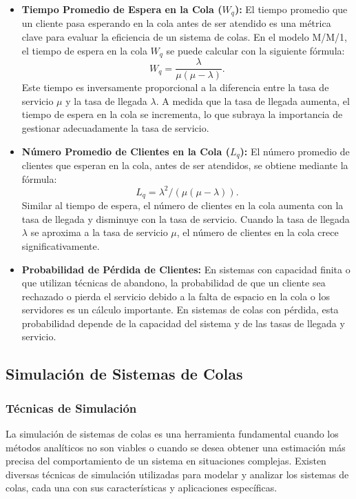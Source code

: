 \documentclass{article}
\begin{document}
\begin{itemize}
    \item \textbf{Tiempo Promedio de Espera en la Cola (\(W_q\)):}  
    El tiempo promedio que un cliente pasa esperando en la cola antes de ser atendido es una métrica clave para evaluar la eficiencia de un sistema de colas. En el modelo M/M/1, el tiempo de espera en la cola \(W_q\) se puede calcular con la siguiente fórmula:
    \[
      W_q = \frac{\lambda}{\mu(\mu - \lambda)}.
    \]
    Este tiempo es inversamente proporcional a la diferencia entre la tasa de servicio \( \mu \) y la tasa de llegada \( \lambda \). A medida que la tasa de llegada aumenta, el tiempo de espera en la cola se incrementa, lo que subraya la importancia de gestionar adecuadamente la tasa de servicio.

    \item \textbf{Número Promedio de Clientes en la Cola (\(L_q\)):}  
    El número promedio de clientes que esperan en la cola, antes de ser atendidos, se obtiene mediante la fórmula:
    \[
      L_q = \lambda^2 / (\mu(\mu - \lambda)).
    \]
    Similar al tiempo de espera, el número de clientes en la cola aumenta con la tasa de llegada y disminuye con la tasa de servicio. Cuando la tasa de llegada \( \lambda \) se aproxima a la tasa de servicio \( \mu \), el número de clientes en la cola crece significativamente.

    \item \textbf{Probabilidad de Pérdida de Clientes:}  
    En sistemas con capacidad finita o que utilizan técnicas de abandono, la probabilidad de que un cliente sea rechazado o pierda el servicio debido a la falta de espacio en la cola o los servidores es un cálculo importante. En sistemas de colas con pérdida, esta probabilidad depende de la capacidad del sistema y de las tasas de llegada y servicio.
\end{itemize}


\subsection{Simulación de Sistemas de Colas}
\subsubsection{Técnicas de Simulación}
La simulación de sistemas de colas es una herramienta fundamental cuando los métodos analíticos no son viables o cuando se desea obtener una estimación más precisa del comportamiento de un sistema en situaciones complejas. Existen diversas técnicas de simulación utilizadas para modelar y analizar los sistemas de colas, cada una con sus características y aplicaciones específicas.
\end{document}
